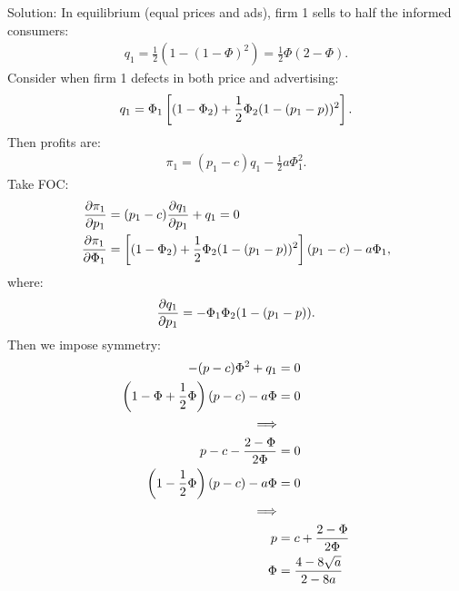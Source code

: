 \begin{enumerate}
	      Solution: In equilibrium (equal prices and ads), firm 1 sells to half the informed consumers:
	      \begin{align*}
		      q_1=\frac{1}{2}(1-(1-\Phi)^2)=\frac{1}{2}\Phi(2-\Phi).
	      \end{align*}
	      Consider when firm 1 defects in both price and advertising:
	      \begin{align*}
		      q_1=\Phi_1\left[(1-\Phi_2)+\frac{1}{2}\Phi_2(1-(p_1-p))^2\right].
	      \end{align*}
	      Then profits are:
	      \begin{align*}
		      \pi_1=(p_1-c)q_1-\frac{1}{2}a\Phi_1^2.
	      \end{align*}
	      Take FOC:
	      \begin{align*}
		      \frac{\partial \pi_1}{\partial p_1}    & =(p_1-c)\frac{\partial q_1}{\partial p_1}+q_1=0                                    \\
		      \frac{\partial \pi_1}{\partial \Phi_1} & =\left[(1-\Phi_2)+\frac{1}{2}\Phi_2(1-(p_1-p))^2\right](p_1-c)-a\Phi_1,
	      \end{align*}
	      where:
	      \begin{align*}
		      \frac{\partial q_1}{\partial p_1}=-\Phi_1\Phi_2(1-(p_1-p)).
	      \end{align*}
	      Then we impose symmetry:
	      \begin{align*}
		      -(p-c)\Phi^2+q_1                       & =0                        \\
		      \left(1-\Phi+\frac{1}{2}\Phi\right)(p-c)-a\Phi & =0                        \\
		      \Longrightarrow                                                    \\
		      p-c-\frac{2-\Phi}{2\Phi}               & =0                        \\
		      \left(1-\frac{1}{2}\Phi\right)(p-c)-a\Phi      & =0                        \\
		      \Longrightarrow                                                    \\
		      p                                      & = c+\frac{2-\Phi}{2\Phi}  \\
		      \Phi                                   & =\frac{4-8\sqrt{a}}{2-8a}
	      \end{align*}
\end{enumerate}
